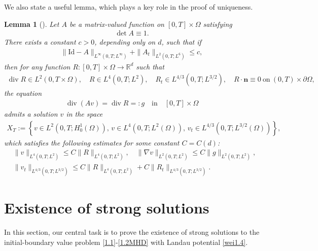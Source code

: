 \documentclass[11pt]{article}
\newtheorem{lemma}[theorem]{Lemma}
\numberwithin{equation}{section}
\begin{document}
We also state a useful lemma, which plays a key role in the proof of uniqueness.
\begin{lemma}[\cite{DM1,RB}]\label{lemma:4.1}
	Let \( A \) be a matrix-valued function on \( [0,T] \times \Omega \) satisfying
	\begin{align*}
	\det A \equiv 1.
	\end{align*}
	There exists a constant \( c>0 \), depending only on \( d \), such that if
	\begin{align*}
	\| \mathrm{Id} - A \|_{L^\infty(0,T; L^\infty)} + \| A_t \|_{L^2(0,T; L^6)} \leq c,
	\end{align*}
	then for any function \( R : [0,T] \times \Omega \to \mathbb{R}^d \) such that
	\begin{align*}
	\operatorname{div} R \in L^2(0,T \times \Omega), \quad R \in L^4(0,T; L^2), \quad R_t \in L^{4/3}(0,T; L^{3/2}), \quad R \cdot \mathbf{n} \equiv 0 \ \text{on} \ (0,T)\times \partial \Omega,
	\end{align*}
	the equation
	\begin{align*}
	\operatorname{div}(Av) = \operatorname{div} R =: g \quad \text{in} \quad [0,T] \times \Omega
	\end{align*}
	admits a solution \( v \) in the space
	\begin{align*}
	X_T := \left\{ v \in L^2(0,T; H_0^1(\Omega)), \, v \in L^4(0,T; L^2(\Omega)), \, v_t \in L^{4/3}(0,T; L^{3/2}(\Omega)) \right\},
	\end{align*}
	which satisfies the following estimates for some constant \( C=C(d) \):
	\begin{equation}\label{4.9}
		\begin{split}
			&\| v \|_{L^4(0,T; L^2)} \leq C \| R \|_{L^4(0,T; L^2)},
			\quad \| \nabla v \|_{L^2(0,T; L^2)} \leq C \| g \|_{L^2(0,T; L^2)},  \\[6pt]
			& \| v_t \|_{L^{4/3}(0,T; L^{3/2})} \leq C \| R \|_{L^4(0,T; L^2)} + C \| R_t \|_{L^{4/3}(0,T; L^{3/2})}.
		\end{split}
	\end{equation}
\end{lemma}

\section{Existence of strong solutions}
In this section,  our central task is to prove  the existence of strong solutions to the initial-boundary value problem
	\eqref{1.1}-\eqref{1.2MHD} with Landau potential \eqref{wei1.4}.
\end{document}
